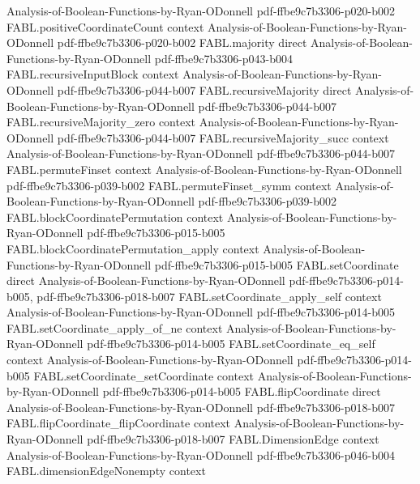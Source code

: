 \begin{theorem}
  {Analysis-of-Boolean-Functions-by-Ryan-ODonnell}
  {pdf-ffbe9c7b3306-p020-b002}
\proofstep
  {FABL.positiveCoordinateCount}
  {context}
  {Analysis-of-Boolean-Functions-by-Ryan-ODonnell}
  {pdf-ffbe9c7b3306-p020-b002}
\proofstep
  {FABL.majority}
  {direct}
  {Analysis-of-Boolean-Functions-by-Ryan-ODonnell}
  {pdf-ffbe9c7b3306-p043-b004}
\proofstep
  {FABL.recursiveInputBlock}
  {context}
  {Analysis-of-Boolean-Functions-by-Ryan-ODonnell}
  {pdf-ffbe9c7b3306-p044-b007}
\proofstep
  {FABL.recursiveMajority}
  {direct}
  {Analysis-of-Boolean-Functions-by-Ryan-ODonnell}
  {pdf-ffbe9c7b3306-p044-b007}
\proofstep
  {FABL.recursiveMajority_zero}
  {context}
  {Analysis-of-Boolean-Functions-by-Ryan-ODonnell}
  {pdf-ffbe9c7b3306-p044-b007}
\proofstep
  {FABL.recursiveMajority_succ}
  {context}
  {Analysis-of-Boolean-Functions-by-Ryan-ODonnell}
  {pdf-ffbe9c7b3306-p044-b007}
\proofstep
  {FABL.permuteFinset}
  {context}
  {Analysis-of-Boolean-Functions-by-Ryan-ODonnell}
  {pdf-ffbe9c7b3306-p039-b002}
\proofstep
  {FABL.permuteFinset_symm}
  {context}
  {Analysis-of-Boolean-Functions-by-Ryan-ODonnell}
  {pdf-ffbe9c7b3306-p039-b002}
\proofstep
  {FABL.blockCoordinatePermutation}
  {context}
  {Analysis-of-Boolean-Functions-by-Ryan-ODonnell}
  {pdf-ffbe9c7b3306-p015-b005}
\proofstep
  {FABL.blockCoordinatePermutation_apply}
  {context}
  {Analysis-of-Boolean-Functions-by-Ryan-ODonnell}
  {pdf-ffbe9c7b3306-p015-b005}
\proofstep
  {FABL.setCoordinate}
  {direct}
  {Analysis-of-Boolean-Functions-by-Ryan-ODonnell}
  {pdf-ffbe9c7b3306-p014-b005,
    pdf-ffbe9c7b3306-p018-b007}
\proofstep
  {FABL.setCoordinate_apply_self}
  {context}
  {Analysis-of-Boolean-Functions-by-Ryan-ODonnell}
  {pdf-ffbe9c7b3306-p014-b005}
\proofstep
  {FABL.setCoordinate_apply_of_ne}
  {context}
  {Analysis-of-Boolean-Functions-by-Ryan-ODonnell}
  {pdf-ffbe9c7b3306-p014-b005}
\proofstep
  {FABL.setCoordinate_eq_self}
  {context}
  {Analysis-of-Boolean-Functions-by-Ryan-ODonnell}
  {pdf-ffbe9c7b3306-p014-b005}
\proofstep
  {FABL.setCoordinate_setCoordinate}
  {context}
  {Analysis-of-Boolean-Functions-by-Ryan-ODonnell}
  {pdf-ffbe9c7b3306-p014-b005}
\proofstep
  {FABL.flipCoordinate}
  {direct}
  {Analysis-of-Boolean-Functions-by-Ryan-ODonnell}
  {pdf-ffbe9c7b3306-p018-b007}
\proofstep
  {FABL.flipCoordinate_flipCoordinate}
  {context}
  {Analysis-of-Boolean-Functions-by-Ryan-ODonnell}
  {pdf-ffbe9c7b3306-p018-b007}
\proofstep
  {FABL.DimensionEdge}
  {context}
  {Analysis-of-Boolean-Functions-by-Ryan-ODonnell}
  {pdf-ffbe9c7b3306-p046-b004}
\proofstep
  {FABL.dimensionEdgeNonempty}
  {context}

\end{theorem}
